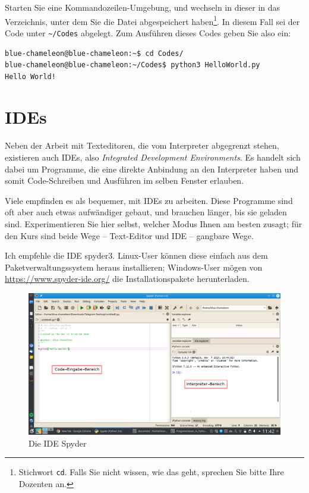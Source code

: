 Starten Sie eine Kommandozeilen-Umgebung, und wechseln in dieser in das Verzeichnis, unter dem Sie die Datei abgespeichert haben\footnote{Stichwort \texttt{cd}. Falls Sie nicht wissen, wie das geht, sprechen Sie bitte Ihre Dozenten an.}. In diesem Fall sei der Code unter \texttt{\textasciitilde/Codes} abgelegt. Zum Ausführen dieses Codes geben Sie also ein:

\begin{cmdbox}
\begin{verbatim}
blue-chameleon@blue-chameleon:~$ cd Codes/
blue-chameleon@blue-chameleon:~/Codes$ python3 HelloWorld.py 
Hello World!
\end{verbatim}
\end{cmdbox}



\section{IDEs}
Neben der Arbeit mit Texteditoren, die vom Interpreter abgegrenzt stehen, existieren auch IDEs, also \emph{Integrated Development Environments}. Es handelt sich dabei um Programme, die eine direkte Anbindung an den Interpreter haben und somit Code-Schreiben und Ausführen im selben Fenster erlauben.

Viele empfinden es als bequemer, mit IDEs zu arbeiten. Diese Programme sind oft aber auch etwas aufwändiger gebaut, und brauchen länger, bis sie geladen sind. Experimentieren Sie hier selbst, welcher Modus Ihnen am besten zusagt; für den Kurs sind beide Wege -- Text-Editor und IDE -- gangbare Wege.

Ich empfehle die IDE spyder3. Linux-User können diese einfach aus dem Paketverwaltungssystem heraus installieren; Windows-User mögen von \url{https://www.spyder-ide.org/} die Installationspakete herunterladen.

\begin{figure}
	\includegraphics[width=\linewidth]{./gfx/Spyder}
	\caption{Die IDE Spyder} \label{gfx:Spyder}
\end{figure}

